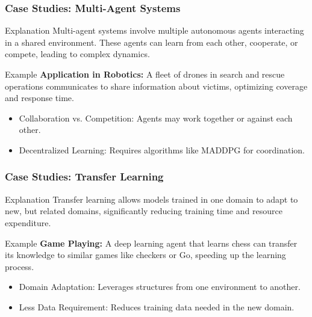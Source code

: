 \documentclass[aspectratio=169]{beamer}
\begin{document}
\begin{frame}[fragile]
    \frametitle{Case Studies: Multi-Agent Systems}
    \begin{block}{Explanation}
        Multi-agent systems involve multiple autonomous agents interacting in a shared environment. These agents can learn from each other, cooperate, or compete, leading to complex dynamics.
    \end{block}
    
    \begin{block}{Example}
        \textbf{Application in Robotics:} A fleet of drones in search and rescue operations communicates to share information about victims, optimizing coverage and response time.
    \end{block}
    
    \begin{itemize}
        \item Collaboration vs. Competition: Agents may work together or against each other.
        \item Decentralized Learning: Requires algorithms like MADDPG for coordination.
    \end{itemize}
\end{frame}

\begin{frame}[fragile]
    \frametitle{Case Studies: Transfer Learning}
    \begin{block}{Explanation}
        Transfer learning allows models trained in one domain to adapt to new, but related domains, significantly reducing training time and resource expenditure.
    \end{block}
    
    \begin{block}{Example}
        \textbf{Game Playing:} A deep learning agent that learns chess can transfer its knowledge to similar games like checkers or Go, speeding up the learning process.
    \end{block}
    
    \begin{itemize}
        \item Domain Adaptation: Leverages structures from one environment to another.
        \item Less Data Requirement: Reduces training data needed in the new domain.
    \end{itemize}
\end{frame}
\end{document}
